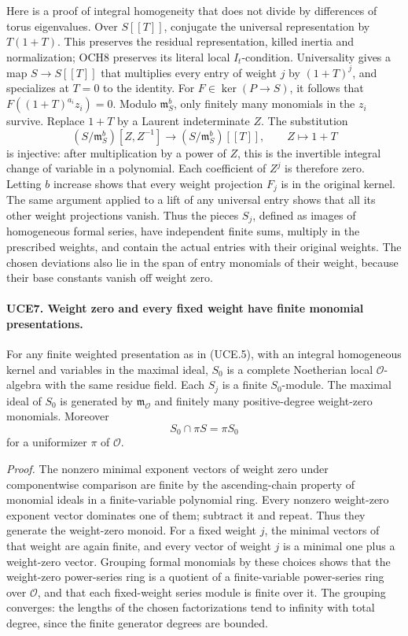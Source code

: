 Here is a proof of integral homogeneity that does not divide by
differences of torus eigenvalues.  Over \(S[[T]]\), conjugate the
universal representation by \(T(1+T)\).  This preserves the
residual representation, killed inertia and normalization; OCH8
preserves its literal local \(I_t\)-condition.  Universality gives
a map \(S\to S[[T]]\) that multiplies every entry of weight \(j\)
by \((1+T)^j\), and specializes at \(T=0\) to the identity.
For \(F\in\ker(P\to S)\), it follows that
\(F((1+T)^{a_i}z_i)=0\).
Modulo \(\mathfrak m_S^b\), only finitely many monomials in the
\(z_i\) survive.  Replace \(1+T\) by a Laurent indeterminate
\(Z\).  The substitution
\[
 (S/\mathfrak m_S^b)[Z,Z^{-1}]
       \longrightarrow(S/\mathfrak m_S^b)[[T]],\qquad Z\mapsto1+T
\]
is injective: after multiplication by a power of \(Z\), this is
the invertible integral change of variable in a polynomial.
Each coefficient of \(Z^j\) is therefore zero.  Letting \(b\)
increase shows that every weight projection \(F_j\) is in the
original kernel.  The same argument applied to a lift of any
universal entry shows that all its other weight projections vanish.
Thus the pieces \(S_j\), defined as images of homogeneous formal
series, have independent finite sums, multiply in the prescribed
weights, and contain the actual entries with their original weights.
The chosen deviations also lie in the span of entry monomials of
their weight, because their base constants vanish off weight zero.

\paragraph{UCE7. Weight zero and every fixed weight have finite monomial presentations.}
\label{claim:UCE7}
For any finite weighted presentation as in (UCE.5), with an integral
homogeneous kernel and variables in the maximal ideal, \(S_0\) is
a complete Noetherian local \(\mathcal O\)-algebra with the same
residue field.  Each \(S_j\) is a finite \(S_0\)-module.  The
maximal ideal of \(S_0\) is generated by \(\mathfrak m_{\mathcal O}\)
and finitely many positive-degree weight-zero monomials.  Moreover
\[
               S_0\cap\pi S=\pi S_0
 \tag{UCE.6}
\]
for a uniformizer \(\pi\) of \(\mathcal O\).

\emph{Proof.}
The nonzero minimal exponent vectors of weight zero under
componentwise comparison are finite by the ascending-chain property
of monomial ideals in a finite-variable polynomial ring.  Every
nonzero weight-zero exponent vector dominates one of them; subtract
it and repeat.  Thus they generate the weight-zero monoid.  For
a fixed weight \(j\), the minimal vectors of that weight are
again finite, and every vector of weight \(j\) is a minimal one
plus a weight-zero vector.  Grouping formal monomials by these
choices shows that the weight-zero power-series ring is a quotient
of a finite-variable power-series ring over \(\mathcal O\), and
that each fixed-weight series module is finite over it.  The
grouping converges: the lengths of the chosen factorizations tend
to infinity with total degree, since the finite generator degrees
are bounded.

